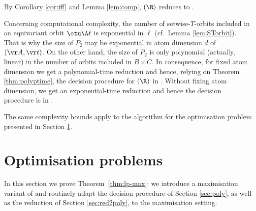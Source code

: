 By Corollary \ref{cor:iff} and Lemma \ref{lem:comp},
\finineqsolvname$(\R)$  reduces to \allpolyineqsolvname.


\smallskip

%






Concerning computational complexity,
the number of setwise-$T$-orbits included in an equivariant orbit $\otu \A \ell$ is exponential in $\ell$
(cf.~Lemma \ref{lem:STorbit}).
That is why 
the size of  $P_2$ may be exponential in atom dimension $d$ of $(\vr A, \vr t)$.
On the other hand, the size of $P_2$ is only polynomial
(actually, linear) in the number of orbits included in $B\times C$.
In consequence, for fixed atom dimension we get a polynomial-time reduction and hence,
relying on Theorem \ref{thm:polyptime},
the decision procedure for \finineqsolvname$(\R)$ in \PTIME.
Without fixing atom dimension, we get an exponential-time reduction and hence
the decision procedure is in \EXPTIME.

The same complexity bounds apply to the algorithm for the optimisation problem presented in Section \ref{sec:max}.




%


\section{Optimisation problems}
\label{sec:max}


In this section we prove Theorem~\ref{thm:lp-max}:
we introduce a maximisation variant of \polyineqsolvname and routinely adapt
the decision procedure of Section \ref{sec:poly}, as well as
the reduction of Section \ref{sec:red2poly},
to the maximisation setting.



